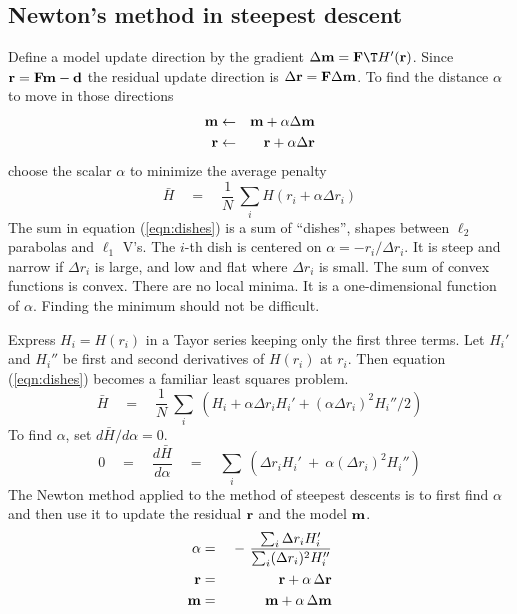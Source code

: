 \subsection{Newton's method in steepest descent}
\par
Define a model update direction by the gradient
$\Delta \bold m = \bold F\T H'(\bold r)$.
Since $\bold r = \bold F\bold m -\bold d$
the residual update direction is
$\Delta \bold r = \bold F \Delta \bold m$.
To find the distance $\alpha$ to move in those directions
\begin{eqnarray}
\bold m &\leftarrow& \bold m + \alpha\Delta \bold m
\\ 
\bold r &\leftarrow& \bold r + \alpha\Delta \bold r
\end{eqnarray}
choose the scalar $\alpha$ to minimize the average penalty
\begin{equation}
\label{eqn:dishes}
\bar H \quad=\quad
\frac{1}{N} \ 
\sum_i
H( r_i+\alpha\Delta r_i)
\end{equation}
The sum in equation (\ref{eqn:dishes})
is a sum of ``dishes'', shapes between $\ell_2$ parabolas and $\ell_1$ V's.
The $i$-th dish is centered on
$\alpha = -r_i/\Delta r_i$.
It is steep and narrow if $\Delta r_i$ is large, and low and flat where $\Delta r_i$ is small.
The sum of convex functions is convex.
There are no local minima.
It is a one-dimensional function of $\alpha$.
Finding the minimum should not be difficult.
\par
Express $H_i=H(r_i)$ in a Tayor series keeping only the first three terms.
Let $H_i'$ and $H_i''$ be first and second derivatives of $H(r_i)$ at $r_i$.
Then equation (\ref{eqn:dishes}) becomes a familiar least squares problem.
\begin{equation}
\bar H \quad=\quad
\frac{1}{N} \ 
\sum_i 
\ ( H_i + \alpha\Delta r_i H_i' + (\alpha\Delta r_i)^2 H_i''/2 )
\end{equation}
To find $\alpha$, set $d\bar H/d\alpha=0$.
\begin{equation}
0\quad=\quad \frac{d\bar H}{d\alpha}
\quad=\quad
\sum_i
\ ( \Delta r_i
H_i'
\ +\ 
\alpha
(\Delta r_i)^2
H_i''  )
\end{equation}
The Newton method applied to the method of steepest descents
is to first find $\alpha$ and then use it to update the residual $\bold r$ and the model $\bold m$.
\begin{eqnarray}
\label{eqn:newton1}
\alpha &=&  \ -\  \frac{\sum_i \Delta r_i     H_i' } 
                {\sum_i (\Delta r_i)^2 H_i'' }
\\
\bold r  &=& \bold r + \alpha\,\Delta \bold r
\\
\label{eqn:newton3}
\bold m  &=& \bold m + \alpha\,\Delta \bold m
\end{eqnarray}
